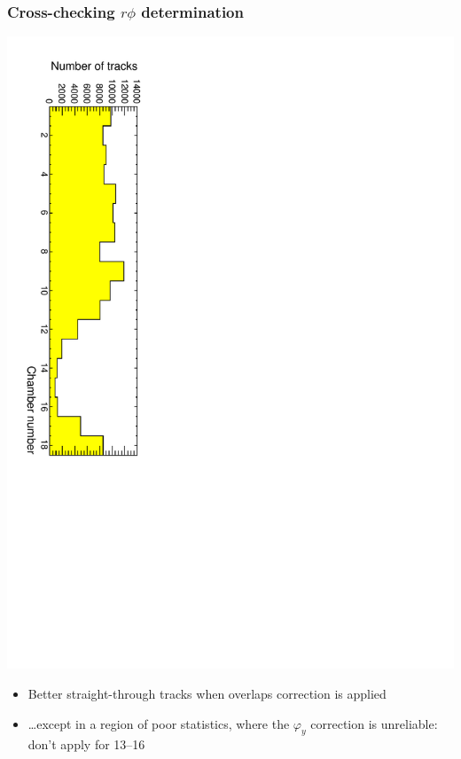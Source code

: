 \documentclass[compress]{beamer}
\begin{document}
\begin{frame}
\frametitle{Cross-checking $r\phi$ determination}
\small

\begin{center}

\includegraphics[height=0.7\linewidth, angle=90]{statistics.pdf}
\end{center}

\begin{itemize}
\item Better straight-through tracks when overlaps correction is applied
\item \ldots except in a region of poor statistics, where the $\varphi_y$ correction is unreliable: don't apply for 13--16
\end{itemize}
\end{frame}
\end{document}

